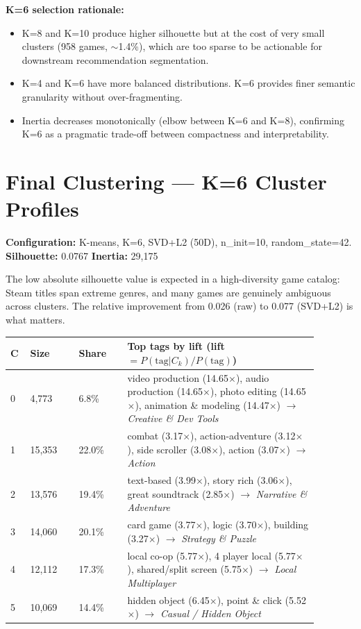 \documentclass[11pt,a4paper]{article}
\begin{document}
\textbf{K=6 selection rationale:}
\begin{itemize}[leftmargin=*]
  \item K=8 and K=10 produce higher silhouette but at the cost of very small clusters (958 games, $\sim$1.4\%), which are too sparse to be actionable for downstream recommendation segmentation.
  \item K=4 and K=6 have more balanced distributions. K=6 provides finer semantic granularity without over-fragmenting.
  \item Inertia decreases monotonically (elbow between K=6 and K=8), confirming K=6 as a pragmatic trade-off between compactness and interpretability.
\end{itemize}

\section{Final Clustering --- K=6 Cluster Profiles}

\textbf{Configuration:} K-means, K=6, SVD+L2 (50D), n\_init=10, random\_state=42.\\
\textbf{Silhouette:} 0.0767 \quad \textbf{Inertia:} 29,175

The low absolute silhouette value is expected in a high-diversity game catalog: Steam titles span extreme genres, and many games are genuinely ambiguous across clusters. The relative improvement from 0.026 (raw) to 0.077 (SVD+L2) is what matters.

\begin{longtable}{p{0.05\linewidth}p{0.14\linewidth}p{0.14\linewidth}p{0.55\linewidth}}
\toprule
\textbf{C} & \textbf{Size} & \textbf{Share} & \textbf{Top tags by lift (lift $= P(\text{tag}|C_k) / P(\text{tag})$)} \\
\midrule
0 & 4,773 & 6.8\% & video production (14.65$\times$), audio production (14.65$\times$), photo editing (14.65$\times$), animation \& modeling (14.47$\times$) $\rightarrow$ \textit{Creative \& Dev Tools} \\
1 & 15,353 & 22.0\% & combat (3.17$\times$), action-adventure (3.12$\times$), side scroller (3.08$\times$), action (3.07$\times$) $\rightarrow$ \textit{Action} \\
2 & 13,576 & 19.4\% & text-based (3.99$\times$), story rich (3.06$\times$), great soundtrack (2.85$\times$) $\rightarrow$ \textit{Narrative \& Adventure} \\
3 & 14,060 & 20.1\% & card game (3.77$\times$), logic (3.70$\times$), building (3.27$\times$) $\rightarrow$ \textit{Strategy \& Puzzle} \\
4 & 12,112 & 17.3\% & local co-op (5.77$\times$), 4 player local (5.77$\times$), shared/split screen (5.75$\times$) $\rightarrow$ \textit{Local Multiplayer} \\
5 & 10,069 & 14.4\% & hidden object (6.45$\times$), point \& click (5.52$\times$) $\rightarrow$ \textit{Casual / Hidden Object} \\
\bottomrule
\end{longtable}
\end{document}
